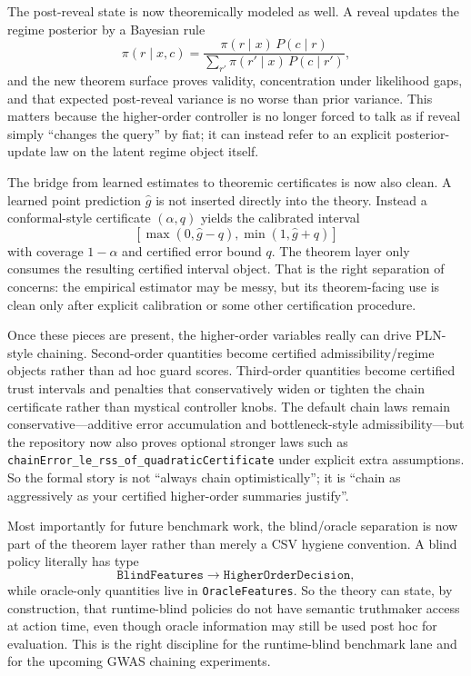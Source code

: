\documentclass[11pt,openany]{report}
\begin{document}
The post-reveal state is now theoremically modeled as well.  A reveal updates
the regime posterior by a Bayesian rule
\[
  \pi(r \mid x, c)
  =
  \frac{\pi(r \mid x)\,P(c \mid r)}
       {\sum_{r'} \pi(r' \mid x)\,P(c \mid r')},
\]
and the new theorem surface proves validity, concentration under likelihood
gaps, and that expected post-reveal variance is no worse than prior variance.
This matters because the higher-order controller is no longer forced to talk as
if reveal simply ``changes the query'' by fiat; it can instead refer to an
explicit posterior-update law on the latent regime object itself.

The bridge from learned estimates to theoremic certificates is now also clean.
A learned point prediction $\hat g$ is not inserted directly into the theory.
Instead a conformal-style certificate $(\alpha, q)$ yields the calibrated
interval
\[
  [\max(0,\hat g - q), \min(1,\hat g + q)]
\]
with coverage $1-\alpha$ and certified error bound $q$.  The theorem layer only
consumes the resulting certified interval object.  That is the right separation
of concerns: the empirical estimator may be messy, but its theorem-facing use
is clean only after explicit calibration or some other certification procedure.

Once these pieces are present, the higher-order variables really can drive
PLN-style chaining.  Second-order quantities become certified
admissibility/regime objects rather than ad hoc guard scores.  Third-order
quantities become certified trust intervals and penalties that conservatively
widen or tighten the chain certificate rather than mystical controller knobs.
The default chain laws remain conservative---additive error accumulation and
bottleneck-style admissibility---but the repository now also proves optional
stronger laws such as
\texttt{chainError\_le\_rss\_of\_quadraticCertificate} under explicit extra
assumptions.  So the formal story is not ``always chain optimistically''; it is
``chain as aggressively as your certified higher-order summaries justify''.

Most importantly for future benchmark work, the blind/oracle separation is now
part of the theorem layer rather than merely a CSV hygiene convention.  A blind
policy literally has type
\[
  \texttt{BlindFeatures} \to \texttt{HigherOrderDecision},
\]
while oracle-only quantities live in \texttt{OracleFeatures}.  So the theory
can state, by construction, that runtime-blind policies do not have semantic
truthmaker access at action time, even though oracle information may still be
used post hoc for evaluation.  This is the right discipline for the
runtime-blind benchmark lane and for the upcoming GWAS chaining experiments.
\end{document}
